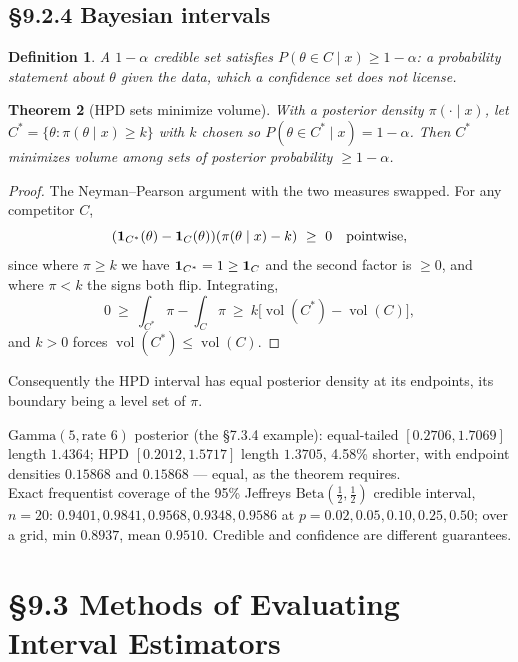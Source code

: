 \documentclass[11pt]{article}
\newtheorem{theorem}{Theorem}[section]
\newtheorem{definition}[theorem]{Definition}
\DeclareMathOperator{\vol}{vol}
\begin{document}
\subsection{\S9.2.4 Bayesian intervals}
\begin{definition}
A $1-\alpha$ credible set satisfies $P(\theta\in C\mid x)\ge1-\alpha$: a probability statement about $\theta$ given the data, which a confidence set does not license.
\end{definition}
\begin{theorem}[HPD sets minimize volume]
With a posterior density $\pi(\cdot\mid x)$, let $C^*=\{\theta:\pi(\theta\mid x)\ge k\}$ with $k$ chosen so $P(\theta\in C^*\mid x)=1-\alpha$. Then $C^*$ minimizes volume among sets of posterior probability $\ge1-\alpha$.
\end{theorem}
\begin{proof}
The Neyman--Pearson argument with the two measures swapped. For any competitor $C$,
\[(\mathbf 1_{C^*}(\theta)-\mathbf 1_C(\theta))(\pi(\theta\mid x)-k)\ \ge\ 0\quad\text{pointwise},\]
since where $\pi\ge k$ we have $\mathbf 1_{C^*}=1\ge\mathbf 1_C$ and the second factor is $\ge0$, and where $\pi<k$ the signs both flip. Integrating,
\[0\ \ge\ \int_{C^*}\pi-\int_C\pi\ \ge\ k\big[\vol(C^*)-\vol(C)\big],\]
and $k>0$ forces $\vol(C^*)\le\vol(C)$.
\end{proof}
Consequently the HPD interval has equal posterior density at its endpoints, its boundary being a level set of $\pi$.
\begin{simbox}
$\mathrm{Gamma}(5,\text{rate }6)$ posterior (the \S7.3.4 example): equal-tailed $[0.2706,1.7069]$ length $1.4364$; HPD $[0.2012,1.5717]$ length $1.3705$, 4.58\% shorter, with endpoint densities $0.15868$ and $0.15868$ --- equal, as the theorem requires.\\
Exact frequentist coverage of the 95\% Jeffreys $\mathrm{Beta}(\frac12,\frac12)$ credible interval, $n=20$: $0.9401,0.9841,0.9568,0.9348,0.9586$ at $p=0.02,0.05,0.10,0.25,0.50$; over a grid, min $0.8937$, mean $0.9510$. Credible and confidence are different guarantees.
\end{simbox}

\section{\S9.3 Methods of Evaluating Interval Estimators}
\end{document}
